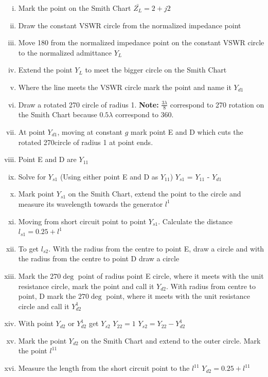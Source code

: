 \begin{exmp}
\begin{enumerate}[(i)]
\item Mark the point on the Smith Chart $\bar{Z_{L}} = 2 + j2$  
\item Draw the constant VSWR circle from the normalized impedance point
\item Move 180\textdegree\; from the normalized impedance point on the constant VSWR circle to the normalized admittance $Y_{L}$
\item Extend the point $Y_{L}$ to meet the bigger circle on the Smith Chart 
\item Where the line meets the VSWR circle mark the point and name it $Y_{d1}$            
\item Draw a rotated 270\textdegree\; circle of radius 1. \textbf{Note:} $\frac{3\lambda}{8}$ correspond to 270\textdegree\; rotation on the Smith Chart because $0.5\lambda$ correspond to 360\textdegree.
\item At point $Y_{d1}$, moving at constant $g$ mark point E and D which cuts the rotated 270\textdegree circle of radius 1 at point ends.
\item Point E and D are $Y_{11}$                        
\item Solve for $Y_{s1}$ (Using either point E and D as $Y_{11}$) $Y_{s1}$ =  $Y_{11}$ -  $Y_{d1}$           
\item Mark point $Y_{s1}$ on the Smith Chart, extend the point to the circle and measure its wavelength towards the generator $l^{1}$ 
\item Moving from short circuit point to point $Y_{s1}$. Calculate the distance
$ l_{s1} = 0.25 + l^{1} $                                    
\item To get $l_{s2}$. With the radius from the centre to point E, draw a circle and with the radius from the centre to point D draw a circle
\item Mark the $270\deg$ point of radius point E circle, where it meets with the unit resistance circle, mark the point and call it $Y_{d2}$. With radius from centre to point, D mark the $270\deg$ point, where it meets with the unit resistance circle and call it $Y_{d2}^{1}$ 
\item With point $Y_{d2}$ or $Y_{d2}^{1}$ get $Y_{s2}$ $Y_{22}=1$ $Y_{s2}=Y_{22}-Y_{d2}^{1}$
\item Mark the point $Y_{d2}$ on the Smith Chart and extend to the outer circle. Mark the point $l^{11}$
\item Measure the length from the short circuit point to the $l^{11}$ $Y_{d2} = 0.25 + l^{11}$
\end{enumerate}
\end{exmp}


